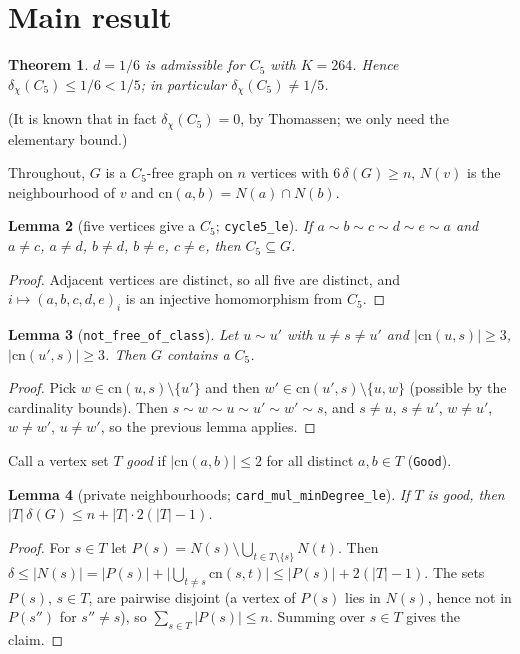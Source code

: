 \documentclass[11pt]{article}
\newtheorem{theorem}{Theorem}
\newtheorem{lemma}[theorem]{Lemma}
\theoremstyle{definition}
\theoremstyle{remark}
\begin{document}
\section{Main result}

\begin{theorem}\label{thm:main}
$d=1/6$ is admissible for $C_5$ with $K=264$. Hence $\delta_\chi(C_5)\le 1/6<1/5$; in particular
$\delta_\chi(C_5)\neq 1/5$.
\end{theorem}

(It is known that in fact $\delta_\chi(C_5)=0$, by Thomassen; we only need the elementary bound.)

Throughout, $G$ is a $C_5$-free graph on $n$ vertices with $6\,\delta(G)\ge n$, $N(v)$ is the neighbourhood of
$v$ and $\mathrm{cn}(a,b)=N(a)\cap N(b)$.

\begin{lemma}[five vertices give a $C_5$; \texttt{cycle5\_le}]
If $a\sim b\sim c\sim d\sim e\sim a$ and $a\ne c$, $a\ne d$, $b\ne d$, $b\ne e$, $c\ne e$, then $C_5\subseteq G$.
\end{lemma}
\begin{proof}
Adjacent vertices are distinct, so all five are distinct, and $i\mapsto(a,b,c,d,e)_i$ is an injective homomorphism
from $C_5$.
\end{proof}

\begin{lemma}[\texttt{not\_free\_of\_class}]\label{lem:class}
Let $u\sim u'$ with $u\ne s\ne u'$ and $|\mathrm{cn}(u,s)|\ge 3$, $|\mathrm{cn}(u',s)|\ge 3$. Then $G$ contains a
$C_5$.
\end{lemma}
\begin{proof}
Pick $w\in\mathrm{cn}(u,s)\setminus\{u'\}$ and then $w'\in\mathrm{cn}(u',s)\setminus\{u,w\}$ (possible by the
cardinality bounds). Then $s\sim w\sim u\sim u'\sim w'\sim s$, and $s\ne u$, $s\ne u'$, $w\ne u'$, $w\ne w'$,
$u\ne w'$, so the previous lemma applies.
\end{proof}

Call a vertex set $T$ \emph{good} if $|\mathrm{cn}(a,b)|\le 2$ for all distinct $a,b\in T$ (\texttt{Good}).

\begin{lemma}[private neighbourhoods; \texttt{card\_mul\_minDegree\_le}]\label{lem:count}
If $T$ is good, then $|T|\,\delta(G)\le n+|T|\cdot 2(|T|-1)$.
\end{lemma}
\begin{proof}
For $s\in T$ let $P(s)=N(s)\setminus\bigcup_{t\in T\setminus\{s\}}N(t)$. Then
$\delta\le |N(s)| = |P(s)| + \bigl|\bigcup_{t\ne s}\mathrm{cn}(s,t)\bigr| \le |P(s)|+2(|T|-1)$.
The sets $P(s)$, $s\in T$, are pairwise disjoint (a vertex of $P(s)$ lies in $N(s)$, hence not in $P(s'')$ for
$s''\ne s$), so $\sum_{s\in T}|P(s)|\le n$. Summing over $s\in T$ gives the claim.
\end{proof}
\end{document}
